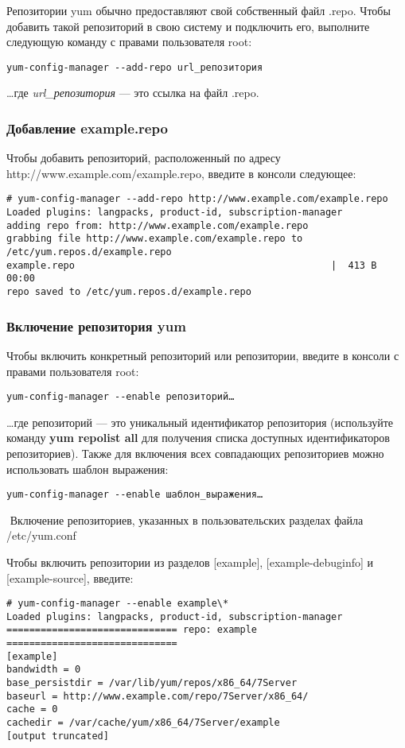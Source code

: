 \documentclass[a4paper,10pt,twoside]{article}
\begin{document}
Репозитории yum обычно предоставляют свой собственный файл  .repo. Чтобы добавить такой репозиторий в свою систему и подключить его, выполните следующую команду с правами пользователя root: 
\begin{verbatim}
yum-config-manager --add-repo url_репозитория
\end{verbatim} 

…где \textit{url\_репозитория} — это ссылка на файл .repo.


\subsubsection{Добавление example.repo}
Чтобы добавить репозиторий, расположенный по адресу http://www.example.com/example.repo, введите в консоли следующее:
\begin{verbatim}
# yum-config-manager --add-repo http://www.example.com/example.repo
Loaded plugins: langpacks, product-id, subscription-manager
adding repo from: http://www.example.com/example.repo
grabbing file http://www.example.com/example.repo to /etc/yum.repos.d/example.repo
example.repo                                             |  413 B     00:00
repo saved to /etc/yum.repos.d/example.repo
\end{verbatim} 



\subsubsection{Включение репозитория yum}
Чтобы включить конкретный репозиторий или репозитории, введите в консоли с правами пользователя root: 
\begin{verbatim}
yum-config-manager --enable репозиторий…
\end{verbatim} 

…где репозиторий — это уникальный идентификатор репозитория (используйте команду \textbf{yum repolist all} для получения списка доступных идентификаторов репозиториев). Также для включения всех совпадающих репозиториев можно использовать шаблон выражения:
\begin{verbatim}
yum-config-manager --enable шаблон_выражения…
\end{verbatim} 
⁠
Включение репозиториев, указанных в пользовательских разделах файла /etc/yum.conf

Чтобы включить репозитории из разделов [example], [example-debuginfo] и [example-source], введите:
\begin{verbatim}
# yum-config-manager --enable example\*
Loaded plugins: langpacks, product-id, subscription-manager
============================== repo: example ==============================
[example]
bandwidth = 0
base_persistdir = /var/lib/yum/repos/x86_64/7Server
baseurl = http://www.example.com/repo/7Server/x86_64/
cache = 0
cachedir = /var/cache/yum/x86_64/7Server/example
[output truncated]
\end{verbatim} 
⁠
\end{document}

